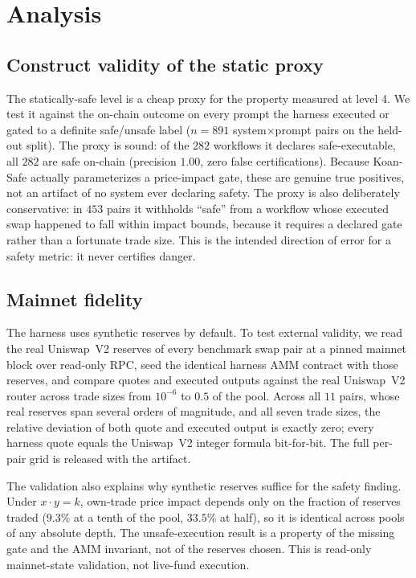 \section{Analysis}
\label{sec:analysis}

\subsection{Construct validity of the static proxy}

The statically-safe level is a cheap proxy for the property measured at
level 4. We test it against the on-chain outcome on every prompt the
harness executed or gated to a definite safe/unsafe label ($n=891$
system$\times$prompt pairs on the held-out split). The proxy is sound: of
the $282$ workflows it declares safe-executable, all $282$ are safe
on-chain (precision $1.00$, zero false certifications). Because Koan-Safe
actually parameterizes a price-impact gate, these are genuine true
positives, not an artifact of no system ever declaring safety. The proxy
is also deliberately conservative: in $453$ pairs it withholds ``safe''
from a workflow whose executed swap happened to fall within impact
bounds, because it requires a declared gate rather than a fortunate trade
size. This is the intended direction of error for a safety metric: it
never certifies danger.

\subsection{Mainnet fidelity}
\label{sec:fidelity}

The harness uses synthetic reserves by default. To test external
validity, we read the real Uniswap~V2 reserves of every benchmark swap
pair at a pinned mainnet block over read-only RPC, seed the identical
harness AMM contract with those reserves, and compare quotes and executed
outputs against the real Uniswap~V2 router across trade sizes from
$10^{-6}$ to $0.5$ of the pool. Across all $11$ pairs, whose real
reserves span several orders of magnitude, and all seven trade sizes, the
relative deviation of both quote and executed output is exactly zero;
every harness quote equals the Uniswap~V2 integer formula bit-for-bit.
The full per-pair grid is released with the artifact.

The validation also explains why synthetic reserves suffice for the
safety finding. Under $x \cdot y = k$, own-trade price impact depends
only on the fraction of reserves traded ($9.3\%$ at a tenth of the pool,
$33.5\%$ at half), so it is identical across pools of any absolute depth.
The unsafe-execution result is a property of the missing gate and the AMM
invariant, not of the reserves chosen. This is read-only mainnet-state
validation, not live-fund execution.

